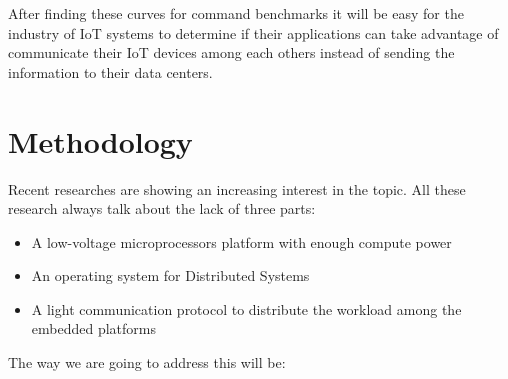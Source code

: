 After finding these curves for command benchmarks it will be easy for the
industry of IoT systems to determine if their applications can take advantage
of communicate their IoT devices among each others instead of sending the
information to their data centers.


\section{Methodology}
\noindent

Recent researches \cite{Saldana} \cite{Gallego} \cite{McMahon} \cite{Liu} are 
showing an increasing interest in the topic.  All these research always talk
about the lack of three parts: 

\begin{itemize}
\item A low-voltage microprocessors platform with enough compute power
\item An operating system for Distributed Systems
\item A light communication protocol to distribute the workload among the
embedded platforms
\end{itemize}

The way we are going to address this will be:


